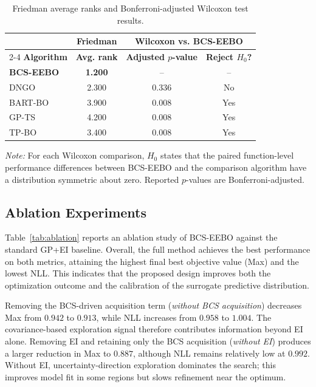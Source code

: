 \documentclass[lettersize,journal]{IEEEtran}
\begin{document}
\begin{table}[t]
  \centering
  \caption{Friedman average ranks and Bonferroni-adjusted Wilcoxon test results.}
  \label{tab:friedman_wilcoxon}
  \footnotesize
  \renewcommand{\arraystretch}{1.12}
  \begin{tabular*}{\columnwidth}{@{\extracolsep{\fill}}lccc@{}}
  \hline
  & \textbf{Friedman} &
  \multicolumn{2}{c}{\textbf{Wilcoxon vs. BCS-EEBO}} \\
  \cline{2-4}
  \textbf{Algorithm} &
  \textbf{Avg. rank} &
  \textbf{Adjusted $p$-value} &
  \textbf{Reject $H_0$?} \\
  \hline
  \textbf{BCS-EEBO} & \textbf{1.200} & --    & --  \\
  DNGO              & 2.300          & 0.336 & No  \\
  BART-BO           & 3.900          & 0.008 & Yes \\
  GP-TS             & 4.200          & 0.008 & Yes \\
  TP-BO             & 3.400          & 0.008 & Yes \\
  \hline
  \end{tabular*}
  \vspace{2pt}

  \parbox{\columnwidth}{\scriptsize\raggedright
  \emph{Note:} For each Wilcoxon comparison, $H_0$ states that the paired function-level performance differences between BCS-EEBO and the comparison algorithm have a distribution symmetric about zero. Reported $p$-values are Bonferroni-adjusted.\par}
  \end{table}

\subsection{Ablation Experiments}
Table~\ref{tab:ablation} reports an ablation study of BCS-EEBO against the standard GP+EI baseline.
Overall, the full method achieves the best performance on both metrics, attaining the highest final best objective value (Max) and the lowest NLL. This indicates that the proposed design improves both the optimization outcome and the calibration of the surrogate predictive distribution.

Removing the BCS-driven acquisition term (\emph{without BCS acquisition}) decreases Max from $0.942$ to $0.913$, while NLL increases from $0.958$ to $1.004$. The covariance-based exploration signal therefore contributes information beyond EI alone.
Removing EI and retaining only the BCS acquisition (\emph{without EI}) produces a larger reduction in Max to $0.887$, although NLL remains relatively low at $0.992$. Without EI, uncertainty-direction exploration dominates the search; this improves model fit in some regions but slows refinement near the optimum.
\end{document}
